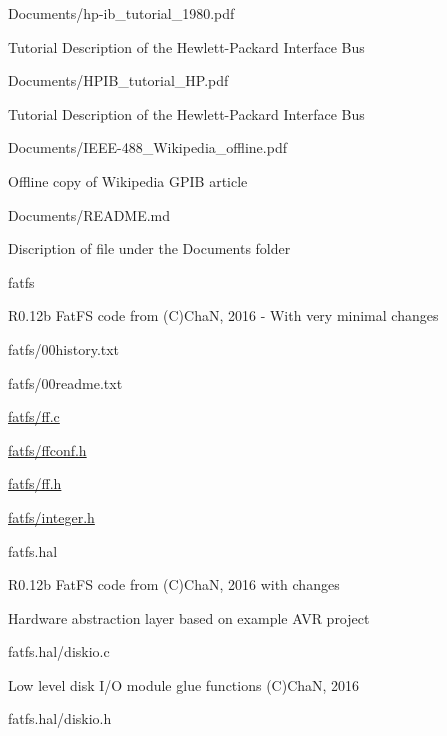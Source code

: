 \begin{DoxyPre}
\begin{DoxyItemize}
\begin{DoxyItemize}
\end{DoxyItemize}
\item Documents/hp-ib\_tutorial\_1980.pdf
\begin{DoxyItemize}
\item Tutorial Description of the Hewlett-Packard Interface Bus
\end{DoxyItemize}
\item Documents/HPIB\_tutorial\_HP.pdf
\begin{DoxyItemize}
\item Tutorial Description of the Hewlett-Packard Interface Bus
\end{DoxyItemize}
\item Documents/IEEE-488\_Wikipedia\_offline.pdf
\begin{DoxyItemize}
\item Offline copy of Wikipedia GPIB article
\end{DoxyItemize}
\item Documents/README.md
\begin{DoxyItemize}
\item Discription of file under the Documents folder
\end{DoxyItemize}
\item fatfs
\begin{DoxyItemize}
\item R0.12b FatFS code from (C)ChaN, 2016 - With very minimal changes
\item fatfs/00history.txt
\item fatfs/00readme.txt
\item \hyperlink{ff_8c}{fatfs/ff.c}
\item \hyperlink{ffconf_8h}{fatfs/ffconf.h}
\item \hyperlink{ff_8h}{fatfs/ff.h}
\item \hyperlink{integer_8h}{fatfs/integer.h}
\end{DoxyItemize}
\item fatfs.hal
\begin{DoxyItemize}
\item R0.12b FatFS code from (C)ChaN, 2016 with changes
\item Hardware abstraction layer based on example AVR project
\item fatfs.hal/diskio.c
\begin{DoxyItemize}
\item Low level disk I/O module glue functions (C)ChaN, 2016
\end{DoxyItemize}
\item fatfs.hal/diskio.h

\end{DoxyItemize}
\end{DoxyItemize}
\end{DoxyPre}
